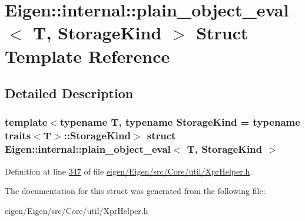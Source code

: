 \hypertarget{struct_eigen_1_1internal_1_1plain__object__eval}{}\section{Eigen\+:\+:internal\+:\+:plain\+\_\+object\+\_\+eval$<$ T, Storage\+Kind $>$ Struct Template Reference}
\label{struct_eigen_1_1internal_1_1plain__object__eval}


\subsection{Detailed Description}
\subsubsection*{template$<$typename T, typename Storage\+Kind = typename traits$<$\+T$>$\+::\+Storage\+Kind$>$\newline
struct Eigen\+::internal\+::plain\+\_\+object\+\_\+eval$<$ T, Storage\+Kind $>$}



Definition at line \hyperlink{eigen_2_eigen_2src_2_core_2util_2_xpr_helper_8h_source_l00347}{347} of file \hyperlink{eigen_2_eigen_2src_2_core_2util_2_xpr_helper_8h_source}{eigen/\+Eigen/src/\+Core/util/\+Xpr\+Helper.\+h}.



The documentation for this struct was generated from the following file\+:\begin{DoxyCompactItemize}
\item 
eigen/\+Eigen/src/\+Core/util/\+Xpr\+Helper.\+h\end{DoxyCompactItemize}
